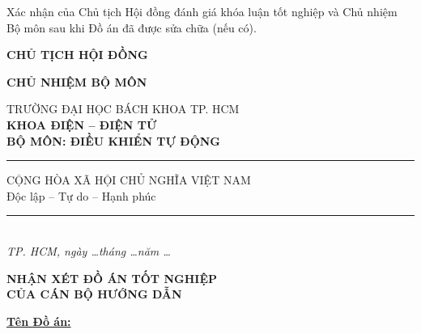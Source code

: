 \documentclass[12pt,a4paper]{article}
\begin{document}
\vspace{0.3cm}

\noindent Xác nhận của Chủ tịch Hội đồng đánh giá khóa luận tốt nghiệp và Chủ nhiệm Bộ môn sau khi Đồ án đã được sửa chữa (nếu có).

\vspace{0.5cm}

\noindent
\begin{minipage}[t]{0.45\textwidth}
    \centering
    \textbf{CHỦ TỊCH HỘI ĐỒNG}
\end{minipage}
\hfill
\begin{minipage}[t]{0.50\textwidth}
    \centering
    \textbf{CHỦ NHIỆM BỘ MÔN} \dotfill
\end{minipage}

\newpage

\noindent
\begin{minipage}[t]{0.48\textwidth}
    \centering
    {\small TRƯỜNG ĐẠI HỌC BÁCH KHOA TP. HCM} \\
    \textbf{KHOA ĐIỆN -- ĐIỆN TỬ} \\
    \textbf{BỘ MÔN: ĐIỀU KHIỂN TỰ ĐỘNG} \\
    \vspace{0.1cm}
    \rule{3.5cm}{0.5pt}
\end{minipage}
\hfill
\begin{minipage}[t]{0.48\textwidth}
    \centering
    {\small CỘNG HÒA XÃ HỘI CHỦ NGHĨA VIỆT NAM} \\
    {\small Độc lập -- Tự do -- Hạnh phúc} \\
    \vspace{0.1cm}
    \rule{4cm}{0.5pt} \\
    \vspace{0.2cm}
    \textit{\small TP. HCM, ngày \dots tháng \dots năm \dots}
\end{minipage}

\vspace{0.5cm}

\begin{center}
    {\large \textbf{NHẬN XÉT ĐỒ ÁN TỐT NGHIỆP}} \\[0.1cm]
    {\large \textbf{CỦA CÁN BỘ HƯỚNG DẪN}}
\end{center}

\vspace{0.2cm}

\noindent \underline{\textbf{Tên Đồ án:}}
\end{document}
